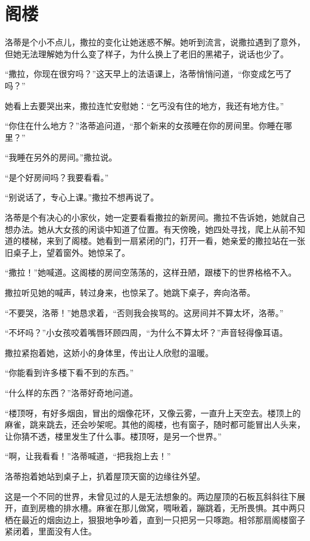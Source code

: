 \documentclass[12pt,UTF-8,openany]{ctexbook}
\begin{document}
\chapter{阁楼}

\begin{large}
    
    洛蒂是个小不点儿，撒拉的变化让她迷惑不解。她听到流言，说撒拉遇到了意外，但她无法理解她为什么变了样子，为什么换上了老旧的黑裙子，说话也少了。
    
    “撒拉，你现在很穷吗？”这天早上的法语课上，洛蒂悄悄问道，“你变成乞丐了吗？”
    
    她看上去要哭出来，撒拉连忙安慰她：“乞丐没有住的地方，我还有地方住。”
    
    “你住在什么地方？”洛蒂追问道，“那个新来的女孩睡在你的房间里。你睡在哪里？”
    
    “我睡在另外的房间。”撒拉说。
    
    “是个好房间吗？我要看看。”
    
    “别说话了，专心上课。”撒拉不想再说了。
    
    洛蒂是个有决心的小家伙，她一定要看看撒拉的新房间。撒拉不告诉她，她就自己想办法。她从大女孩的闲谈中知道了位置。有天傍晚，她四处寻找，爬上从前不知道的楼梯，来到了阁楼。她看到一扇紧闭的门，打开一看，她亲爱的撒拉站在一张旧桌子上，望着窗外。她惊呆了。
    
    “撒拉！”她喊道。这阁楼的房间空荡荡的，这样丑陋，跟楼下的世界格格不入。
    
    撒拉听见她的喊声，转过身来，也惊呆了。她跳下桌子，奔向洛蒂。
    
    “不要哭，洛蒂！”她恳求着，“否则我会挨骂的。这房间并不算太坏，洛蒂。”
    
    “不坏吗？”小女孩咬着嘴唇环顾四周，“为什么不算太坏？”声音轻得像耳语。
    
    撒拉紧抱着她，这娇小的身体里，传出让人欣慰的温暖。
    
    “你能看到许多楼下看不到的东西。”
    
    “什么样的东西？”洛蒂好奇地问道。
    
    “楼顶呀，有好多烟囱，冒出的烟像花环，又像云雾，一直升上天空去。楼顶上的麻雀，跳来跳去，还会吵架呢。其他的阁楼，也有窗子，随时都可能冒出人头来，让你猜不透，楼里发生了什么事。楼顶呀，是另一个世界。”
    
    “啊，让我看看！”洛蒂喊道，“把我抱上去！”
    
    洛蒂抱着她站到桌子上，扒着屋顶天窗的边缘往外望。
    
    这是一个不同的世界，未曾见过的人是无法想象的。两边屋顶的石板瓦斜斜往下展开，直到房檐的排水槽。麻雀在那儿做窝，啁啾着，蹦跳着，无所畏惧。其中两只栖在最近的烟囱边上，狠狠地争吵着，直到一只把另一只啄跑。相邻那扇阁楼窗子紧闭着，里面没有人住。
    

\end{large}
\end{document}
